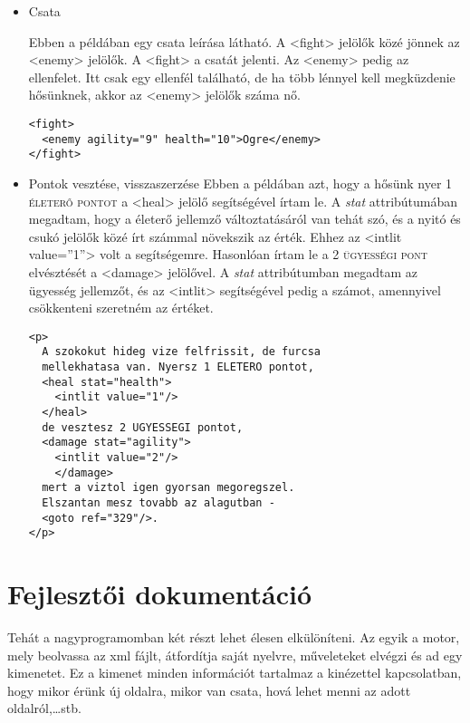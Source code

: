 \documentclass[12pt,a4paper,oneside]{report}
\newcommand{\stat}{\textsc}
\newcommand{\attr}{\emph}
\begin{document}
\begin{itemize}
      \item Csata
      
        Ebben a példában egy csata leírása látható. A
        <{\color{Tag}fight}> jelölők közé jönnek az
        <{\color{Tag}enemy}> jelölők. A <{\color{Tag}fight}> a csatát
        jelenti. Az <{\color{Tag}enemy}> pedig az ellenfelet. Itt csak egy ellenfél
        található, de ha több lénnyel kell megküzdenie hősünknek,
        akkor az <{\color{Tag}enemy}> jelölők száma nő.
        \begin{lstlisting}
<fight>
  <enemy agility="9" health="10">Ogre</enemy>
</fight>
        \end{lstlisting}

      \item Pontok vesztése, visszaszerzése
        Ebben a példában azt, hogy a hősünk nyer 1 \stat{életerő pontot} a
        <{\color{Tag}heal}> jelölő segítségével írtam le. A \attr{stat}
        attribútumában megadtam, hogy a életerő jellemző
        változtatásáról van tehát szó, és a nyitó és csukó jelölők közé írt
        számmal növekszik az érték. Ehhez az <{\color{Tag}intlit}
        {\color{Attr}value}={\color{Value}''1''}> volt a segítségemre.
        Hasonlóan írtam le a 2 \stat{ügyességi pont} elvésztését a <{\color{Tag}damage}>
        jelölővel. A \attr{stat} attribútumban megadtam az ügyesség
        jellemzőt, és az <{\color{Tag}intlit}> segítségével pedig a számot,
        amennyivel csökkenteni szeretném az értéket.
        \begin{lstlisting}
<p>
  A szokokut hideg vize felfrissit, de furcsa
  mellekhatasa van. Nyersz 1 ELETERO pontot,
  <heal stat="health">
    <intlit value="1"/>
  </heal>      
  de vesztesz 2 UGYESSEGI pontot,
  <damage stat="agility">
    <intlit value="2"/>
    </damage>            
  mert a viztol igen gyorsan megoregszel.
  Elszantan mesz tovabb az alagutban -
  <goto ref="329"/>.
</p>
        \end{lstlisting}
    \end{itemize}
    
  \section{Fejlesztői dokumentáció}
    Tehát a nagyprogramomban két részt lehet élesen elkülöníteni. Az
    egyik a motor, mely beolvassa az xml fájlt, átfordítja saját
    nyelvre, műveleteket elvégzi és ad egy kimenetet. Ez a kimenet
    minden információt tartalmaz a kinézettel kapcsolatban, hogy
    mikor érünk új oldalra, mikor van csata, hová lehet menni az
    adott oldalról,\dots stb. 
\end{document}
